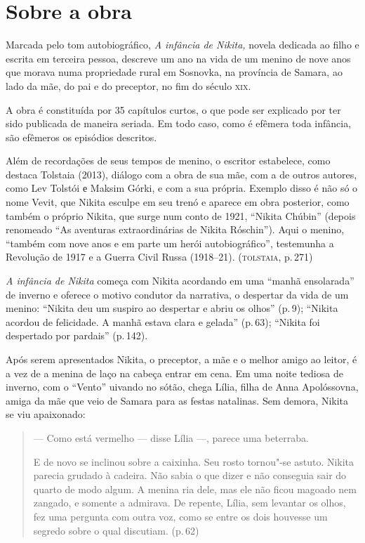 \section{Sobre a obra}\label{para2}

Marcada pelo tom autobiográfico, \emph{A infância de Nikita,} novela
dedicada ao filho e escrita em terceira pessoa, descreve um ano na vida
de um menino de nove anos que morava numa propriedade rural em Sosnovka,
na província de Samara, ao lado da mãe, do pai e do preceptor, no fim do
século \textsc{xix}.

A obra é constituída por 35 capítulos curtos, o que pode ser explicado
por ter sido publicada de maneira seriada. Em todo caso, como é efêmera
toda infância, são efêmeros os episódios descritos.

Além de recordações de seus tempos de menino, o escritor estabelece,
como destaca Tolstaia (2013), diálogo com a obra de sua mãe, com a de
outros autores, como Lev Tolstói е Maksim Górki, e com a sua própria.
Exemplo disso é não só o nome Vevit, que Nikita esculpe em seu trenó e
aparece em obra posterior, como também o próprio Nikita, que surge num
conto de 1921, ``Nikita Chúbin'' (depois renomeado ``As aventuras
extraordinárias de Nikita Róschin''). Aqui o menino, ``também com nove
anos e em parte um herói autobiográfico'', testemunha a Revolução de
1917 e a Guerra Civil Russa (1918--21). (\textsc{tolstaia}, p.\,271)

\asterisc

\emph{A infância de Nikita} começa com Nikita acordando em uma ``manhã
ensolarada'' de inverno e oferece o motivo condutor da narrativa, o
despertar da vida de um menino: ``Nikita deu um suspiro ao despertar e
abriu os olhos'' (p.\,9); ``Nikita acordou de felicidade. A manhã estava
clara e gelada'' (p.\,63); ``Nikita foi despertado por pardais'' (p.\,142).

Após serem apresentados Nikita, o preceptor, a mãe e o melhor amigo ao
leitor, é a vez de a menina de laço na cabeça entrar em cena. Em uma
noite tediosa de inverno, com o ``Vento'' uivando no sótão, chega Lília,
filha de Anna Apolóssovna, amiga da mãe que veio de Samara para as
festas natalinas. Sem demora, Nikita se viu apaixonado:

\begin{quote}
--- Como está vermelho --- disse Lília ---, parece uma beterraba.

E de novo se inclinou sobre a caixinha. Seu rosto tornou"-se astuto.
Nikita parecia grudado à cadeira. Não sabia o que dizer e não conseguia
sair do quarto de modo algum. A menina ria dele, mas ele não ficou
magoado nem zangado, e somente a admirava. De repente, Lília, sem
levantar os olhos, fez uma pergunta com outra voz, como se entre os dois
houvesse um segredo sobre o qual discutiam. (p.\,62)
\end{quote}

